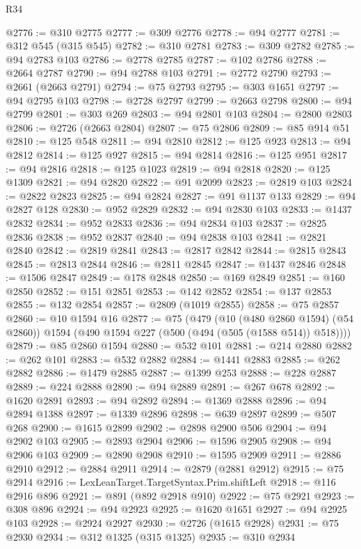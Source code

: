 \begin{lexlean}{R34}
\begin{coremodule}
@2776 := @310 @2775
@2777 := @309 @2776
@2778 := @94 @2777
@2781 := @312 @545 (@315 @545)
@2782 := @310 @2781
@2783 := @309 @2782
@2785 := @94 @2783 @103
@2786 := @2778 @2785
@2787 := @102 @2786
@2788 := @2664 @2787
@2790 := @94 @2788 @103
@2791 := @2772 @2790
@2793 := @2661 (@2663 @2791)
@2794 := @75 @2793
@2795 := @303 @1651
@2797 := @94 @2795 @103
@2798 := @2728 @2797
@2799 := @2663 @2798
@2800 := @94 @2799
@2801 := @303 @269
@2803 := @94 @2801 @103
@2804 := @2800 @2803
@2806 := @2726 (@2663 @2804)
@2807 := @75 @2806
@2809 := @85 @914 @51
@2810 := @125 @548
@2811 := @94 @2810
@2812 := @125 @923
@2813 := @94 @2812
@2814 := @125 @927
@2815 := @94 @2814
@2816 := @125 @951
@2817 := @94 @2816
@2818 := @125 @1023
@2819 := @94 @2818
@2820 := @125 @1309
@2821 := @94 @2820
@2822 := @91 @2099
@2823 := @2819 @103
@2824 := @2822 @2823
@2825 := @94 @2824
@2827 := @91 @1137 @133
@2829 := @94 @2827 @128
@2830 := @952 @2829
@2832 := @94 @2830 @103
@2833 := @1437 @2832
@2834 := @952 @2833
@2836 := @94 @2834 @103
@2837 := @2825 @2836
@2838 := @952 @2837
@2840 := @94 @2838 @103
@2841 := @2821 @2840
@2842 := @2819 @2841
@2843 := @2817 @2842
@2844 := @2815 @2843
@2845 := @2813 @2844
@2846 := @2811 @2845
@2847 := @1437 @2846
@2848 := @1506 @2847
@2849 := @178 @2848
@2850 := @169 @2849
@2851 := @160 @2850
@2852 := @151 @2851
@2853 := @142 @2852
@2854 := @137 @2853
@2855 := @132 @2854
@2857 := @2809 (@1019 @2855)
@2858 := @75 @2857
@2860 := @10 @1594 @16
@2877 := @75
    (@479
      (@10 (@480 @2860 @1594) (@54 @2860))
      @1594
      (@490 @1594 @227 (@500 (@494 (@505 (@1588 @514)) @518))))
@2879 := @85 @2860 @1594
@2880 := @532 @101
@2881 := @214 @2880
@2882 := @262 @101
@2883 := @532 @2882
@2884 := @1441 @2883
@2885 := @262 @2882
@2886 := @1479 @2885
@2887 := @1399 @253
@2888 := @228 @2887
@2889 := @224 @2888
@2890 := @94 @2889
@2891 := @267 @678
@2892 := @1620 @2891
@2893 := @94 @2892
@2894 := @1369 @2888
@2896 := @94 @2894 @1388
@2897 := @1339 @2896
@2898 := @639 @2897
@2899 := @507 @268
@2900 := @1615 @2899
@2902 := @2898 @2900 @506
@2904 := @94 @2902 @103
@2905 := @2893 @2904
@2906 := @1596 @2905
@2908 := @94 @2906 @103
@2909 := @2890 @2908
@2910 := @1595 @2909
@2911 := @2886 @2910
@2912 := @2884 @2911
@2914 := @2879 (@2881 @2912)
@2915 := @75 @2914
@2916 := LexLeanTarget.TargetSyntax.Prim.shiftLeft
@2918 := @116 @2916 @896
@2921 := @891 (@892 @2918 @910)
@2922 := @75 @2921
@2923 := @308 @896
@2924 := @94 @2923
@2925 := @1620 @1651
@2927 := @94 @2925 @103
@2928 := @2924 @2927
@2930 := @2726 (@1615 @2928)
@2931 := @75 @2930
@2934 := @312 @1325 (@315 @1325)
@2935 := @310 @2934

\end{coremodule}
\end{lexlean}
